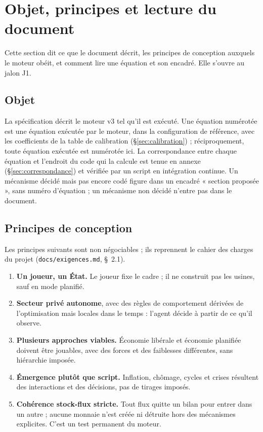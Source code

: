 \documentclass[11pt,a4paper]{article}
\begin{document}
\section{Objet, principes et lecture du document}
\label{sec:objet}
Cette section dit ce que le document décrit, les principes de conception auxquels le moteur obéit, et comment lire une équation et son encadré. Elle s'ouvre au jalon J1.

\subsection*{Objet}
La spécification décrit le moteur v3 tel qu'il est exécuté. Une équation numérotée est une équation exécutée par le moteur, dans la configuration de référence, avec les coefficients de la table de calibration (\S\ref{sec:calibration}) ; réciproquement, toute équation exécutée est numérotée ici. La correspondance entre chaque équation et l'endroit du code qui la calcule est tenue en annexe (\S\ref{sec:correspondance}) et vérifiée par un script en intégration continue. Un mécanisme décidé mais pas encore codé figure dans un encadré « section proposée », sans numéro d'équation ; un mécanisme non décidé n'entre pas dans le document.

\subsection*{Principes de conception}
Les principes suivants sont non négociables ; ils reprennent le cahier des charges du projet (\nolinkurl{docs/exigences.md}, \S~2.1).
\begin{enumerate}
\item \textbf{Un joueur, un État.} Le joueur fixe le cadre ; il ne construit pas les usines, sauf en mode planifié.
\item \textbf{Secteur privé autonome}, avec des règles de comportement dérivées de l'optimisation mais locales dans le temps : l'agent décide à partir de ce qu'il observe.
\item \textbf{Plusieurs approches viables.} Économie libérale et économie planifiée doivent être jouables, avec des forces et des faiblesses différentes, sans hiérarchie imposée.
\item \textbf{Émergence plutôt que script.} Inflation, chômage, cycles et crises résultent des interactions et des décisions, pas de tirages imposés.
\item \textbf{Cohérence stock-flux stricte.} Tout flux quitte un bilan pour entrer dans un autre ; aucune monnaie n'est créée ni détruite hors des mécanismes explicites. C'est un test permanent du moteur.
\end{enumerate}
\end{document}
